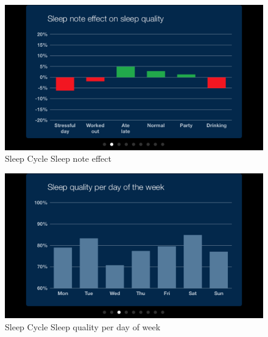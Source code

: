 \begin{figure}[]
	\centering
    \includegraphics[scale=0.5]{images/SleepCycle/SleepNoteEffectOnSleepQuality} 
    \caption{Sleep Cycle Sleep note effect}
    \label{fig:SCDetail}
\end{figure}

\begin{figure}[]
    \centering
    \includegraphics[scale=0.5]{images/SleepCycle/SleepQualityPerDayOfWeek}  
    \caption{Sleep Cycle Sleep quality per day of week}
    \label{fig:SCSettings}
\end{figure}


